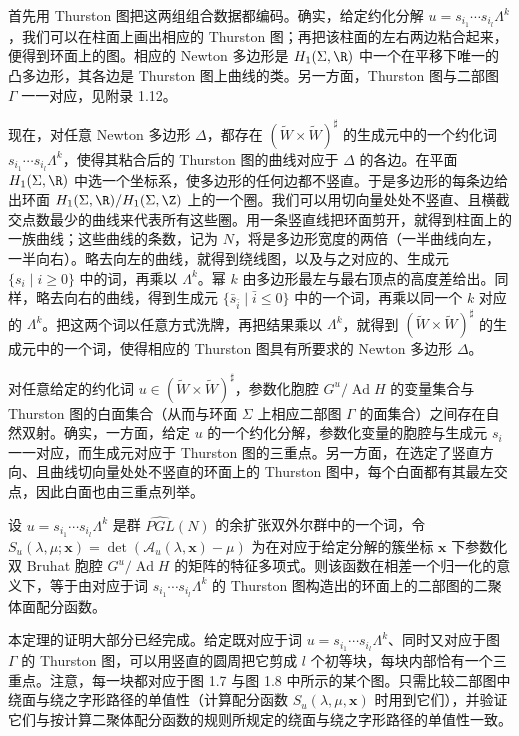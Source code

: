 首先用 Thurston 图把这两组组合数据都编码。确实，给定约化分解 $u=s_{i_1}\cdots s_{i_l}\Lambda^k$，我们可以在柱面上画出相应的 Thurston 图；再把该柱面的左右两边粘合起来，便得到环面上的图。相应的 Newton 多边形是 $H_1(\Sigma,\R)$ 中一个在平移下唯一的凸多边形，其各边是 Thurston 图上曲线的类。另一方面，Thurston 图与二部图 $\Gamma$ 一一对应，见附录 1.12。

现在，对任意 Newton 多边形 $\Delta$，都存在 $(\tilde W\times\tilde W)^{\sharp}$ 的生成元中的一个约化词 $s_{i_1}\cdots s_{i_l}\Lambda^k$，使得其粘合后的 Thurston 图的曲线对应于 $\Delta$ 的各边。在平面 $H_1(\Sigma,\R)$ 中选一个坐标系，使多边形的任何边都不竖直。于是多边形的每条边给出环面 $H_1(\Sigma,\R)/H_1(\Sigma,\Z)$ 上的一个圈。我们可以用切向量处处不竖直、且横截交点数最少的曲线来代表所有这些圈。用一条竖直线把环面剪开，就得到柱面上的一族曲线；这些曲线的条数，记为 $N$，将是多边形宽度的两倍（一半曲线向左，一半向右）。略去向左的曲线，就得到绕线图，以及与之对应的、生成元 $\{s_i\mid i\ge0\}$ 中的词，再乘以 $\Lambda^k$。幂 $k$ 由多边形最左与最右顶点的高度差给出。同样，略去向右的曲线，得到生成元 $\{\bar s_{\bar i}\mid \bar i\le0\}$ 中的一个词，再乘以同一个 $k$ 对应的 $\Lambda^k$。把这两个词以任意方式洗牌，再把结果乘以 $\Lambda^k$，就得到 $(\tilde W\times\tilde W)^{\sharp}$ 的生成元中的一个词，使得相应的 Thurston 图具有所要求的 Newton 多边形 $\Delta$。

对任意给定的约化词 $u\in(\tilde W\times\tilde W)^{\sharp}$，参数化胞腔 $G^u/\operatorname{Ad}H$ 的变量集合与 Thurston 图的白面集合（从而与环面 $\Sigma$ 上相应二部图 $\Gamma$ 的面集合）之间存在自然双射。确实，一方面，给定 $u$ 的一个约化分解，参数化变量的胞腔与生成元 $s_i$ 一一对应，而生成元对应于 Thurston 图的三重点。另一方面，在选定了竖直方向、且曲线切向量处处不竖直的环面上的 Thurston 图中，每个白面都有其最左交点，因此白面也由三重点列举。

\begin{theorem}\label{thm:1.6.1}
设 $u=s_{i_1}\cdots s_{i_l}\Lambda^k$ 是群 $\widehat{PGL}(N)$ 的余扩张双外尔群中的一个词，令 $S_u(\lambda,\mu;\boldsymbol{x})=\det(\mathcal{A}_u(\lambda,\boldsymbol{x})-\mu)$ 为在对应于给定分解的簇坐标 $\boldsymbol{x}$ 下参数化双 Bruhat 胞腔 $G^u/\operatorname{Ad}H$ 的矩阵的特征多项式。则该函数在相差一个归一化的意义下，等于由对应于词 $s_{i_1}\cdots s_{i_l}\Lambda^k$ 的 Thurston 图构造出的环面上的二部图的二聚体面配分函数。
\end{theorem}

本定理的证明大部分已经完成。给定既对应于词 $u=s_{i_1}\cdots s_{i_l}\Lambda^k$、同时又对应于图 $\Gamma$ 的 Thurston 图，可以用竖直的圆周把它剪成 $l$ 个初等块，每块内部恰有一个三重点。注意，每一块都对应于图 1.7 与图 1.8 中所示的某个图。只需比较二部图中绕面与绕之字形路径的单值性（计算配分函数 $S_u(\lambda,\mu,\boldsymbol{x})$ 时用到它们），并验证它们与按计算二聚体配分函数的规则所规定的绕面与绕之字形路径的单值性一致。


